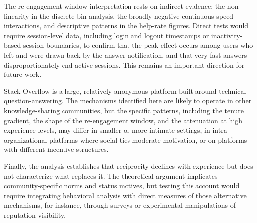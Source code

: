 The re-engagement window interpretation rests on indirect evidence: the non-linearity in the discrete-bin analysis, the broadly negative continuous speed interactions, and descriptive patterns in the help-rate figures. Direct tests would require session-level data, including login and logout timestamps or inactivity-based session boundaries, to confirm that the peak effect occurs among users who left and were drawn back by the answer notification, and that very fast answers disproportionately end active sessions. This remains an important direction for future work.

Stack Overflow is a large, relatively anonymous platform built around technical question-answering. The mechanisms identified here are likely to operate in other knowledge-sharing communities, but the specific patterns, including the tenure gradient, the shape of the re-engagement window, and the attenuation at high experience levels, may differ in smaller or more intimate settings, in intra-organizational platforms where social ties moderate motivation, or on platforms with different incentive structures.

Finally, the analysis establishes that reciprocity declines with experience but does not characterize what replaces it. The theoretical argument implicates com\-munity-spe\-cific norms and status motives, but testing this account would require integrating behavioral analysis with direct measures of those alternative mechanisms, for instance, through surveys or experimental manipulations of reputation visibility.


